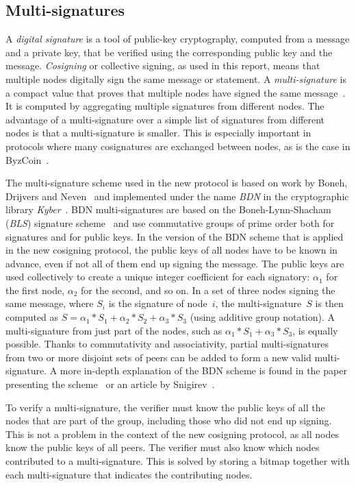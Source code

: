 \subsection{Multi-signatures}

A \emph{digital signature} is a tool of public-key cryptography, computed from a message and a private key, that be verified using the corresponding public key and the message.
\emph{Cosigning} or collective signing, as used in this report, means that multiple nodes digitally sign the same message or statement.
A \emph{multi-signature} is a compact value that proves that multiple nodes have signed the same message~\cite{Boneh18}.
It is computed by aggregating multiple signatures from different nodes.
The advantage of a multi-signature over a simple list of signatures from different nodes is that a multi-signature is smaller.
This is especially important in protocols where many cosignatures are exchanged between nodes, as is the case in ByzCoin~\cite{Koko16}.

The multi-signature scheme used in the new protocol is based on work by Boneh, Drijvers and Neven~\cite{Boneh18} and implemented under the name \emph{BDN} in the cryptographic library \emph{Kyber}~\cite{Kyber}.
BDN multi-signatures are based on the Boneh-Lynn-Shacham (\emph{BLS}) signature scheme~\cite{Boneh01} and use commutative groups of prime order both for signatures and for public keys.
In the version of the BDN scheme that is applied in the new cosigning protocol, the public keys of all nodes have to be known in advance, even if not all of them end up signing the message.
The public keys are used collectively to create a unique integer coefficient for each signatory: $\alpha_1$ for the first node, $\alpha_2$ for the second, and so on.
In a set of three nodes signing the same message, where $S_i$ is the signature of node~$i$, the multi-signature~$S$ is then computed as $S = \alpha_1 * S_1 + \alpha_2 * S_2 + \alpha_3 * S_3$ (using additive group notation).
A multi-signature from just part of the nodes, such as $\alpha_1 * S_1 + \alpha_3 * S_3$, is equally possible.
Thanks to commutativity and associativity, partial multi-signatures from two or more disjoint sets of peers can be added to form a new valid multi-signature.
A more in-depth explanation of the BDN scheme is found in the paper presenting the scheme~\cite{Boneh18} or an article by Snigirev~\cite{Snig18}.

To verify a multi-signature, the verifier must know the public keys of all the nodes that are part of the group, including those who did not end up signing.
This is not a problem in the context of the new cosigning protocol, as all nodes know the public keys of all peers.
The verifier must also know which nodes contributed to a multi-signature.
This is solved by storing a bitmap together with each multi-signature that indicates the contributing nodes.


